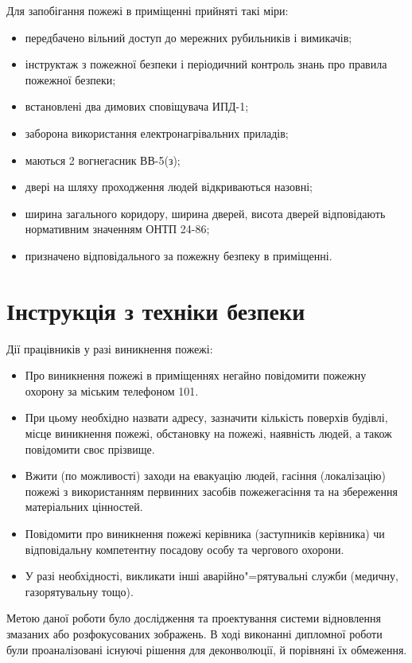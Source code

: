 \documentclass{diploma}
\begin{document}
      Для запобігання пожежі в приміщенні прийняті такі міри:
      \begin{itemize}
        \item передбачено вільний доступ до мережних рубильників і вимикачів;
        \item інструктаж з пожежної безпеки і періодичний контроль знань про
          правила пожежної безпеки;
        \item встановлені два димових сповіщувача ИПД-1;
        \item заборона використання електронагрівальних приладів;
        \item маються 2 вогнегасник ВВ-5(з);
        \item двері на шляху проходження людей відкриваються назовні;
        \item ширина загального коридору, ширина дверей, висота дверей
          відповідають нормативним значенням ОНТП 24-86;
        \item призначено відповідального за пожежну безпеку в приміщенні.
      \end{itemize}
      \clearpage
  \section{Інструкція з техніки безпеки}
    Дії працівників у разі виникнення пожежі:
    \begin{itemize}
      \item Про виникнення пожежі в приміщеннях негайно повідомити пожежну
        охорону за міським телефоном 101.
      \item При цьому необхідно назвати адресу, зазначити кількість поверхів
        будівлі, місце виникнення пожежі, обстановку на пожежі, наявність
        людей, а також повідомити своє прізвище.
      \item Вжити (по можливості) заходи на евакуацію людей, гасіння
        (локалізацію) пожежі з використанням первинних засобів пожежегасіння
        та на збереження матеріальних цінностей.
      \item Повідомити про виникнення пожежі керівника (заступників керівника)
        чи відповідальну компетентну посадову особу та чергового охорони.
      \item У разі необхідності, викликати інші аварійно"=рятувальні служби
        (медичну, газорятувальну тощо).
    \end{itemize}

  Метою даної роботи було дослідження та проектування системи відновлення
  змазаних або розфокусованих зображень.
  В ході виконанні дипломної роботи були проаналізовані існуючі рішення для
  деконволюції, й порівняні їх обмеження.
\end{document}
